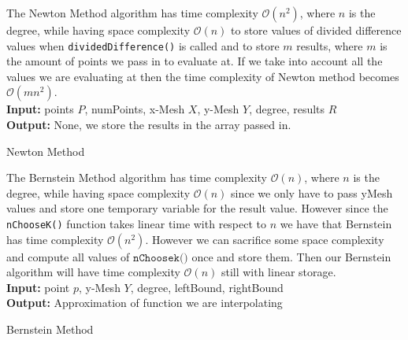 \documentclass[12pt]{article}
\theoremstyle{remark}
\begin{document}
The Newton Method algorithm has time complexity $\mathcal{O}(n^2)$, where $n$ is the degree, while having space complexity $\mathcal{O}(n)$ to store values of divided difference values when \texttt{dividedDifference()} is called and to store $m$ results, where $m$ is the amount of points we pass in to evaluate at. If we take into account all the values we are evaluating at then the time complexity of Newton method becomes $\mathcal{O}(mn^2)$.
\\ 

\textbf{Input:} points $P$, numPoints, x-Mesh $X$, y-Mesh $Y$, degree, 	results $R$ \\
\textbf{Output:} None, we store the results in the array passed in.
\begin{algorithm}[H]
\caption{Newton Method}
\begin{algorithmic}[1]	
	\EndFor
	\EndFor
	\EndFor	 
\end{algorithmic}
\end{algorithm}

The Bernstein Method algorithm has time complexity $\mathcal{O}(n)$, where $n$ is the degree, while having space complexity $\mathcal{O}(n)$ since we only have to pass yMesh values and store one temporary variable for the result value. However since the \texttt{nChooseK()} function takes linear time with respect to $n$ we have that Bernstein has time complexity $\mathcal{O}(n^2)$. However we can sacrifice some space complexity and compute all values of $\texttt{nChoosek()}$ once and store them. Then our Bernstein algorithm will have time complexity $\mathcal{O}(n)$ still with linear storage. \\

\textbf{Input: } point $p$, y-Mesh $Y$, degree, leftBound, rightBound \\
\textbf{Output: } Approximation of function we are interpolating

\begin{algorithm}[H]
	\caption{Bernstein Method}
	\begin{algorithmic}[1]	
		\EndFor \\
	\end{algorithmic}
\end{algorithm}
\end{document}

